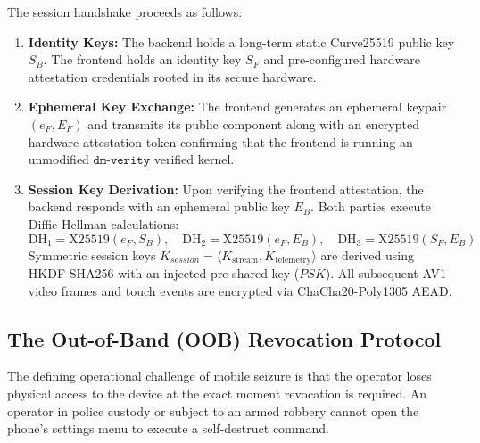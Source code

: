 The session handshake proceeds as follows:
\begin{enumerate}
    \item \textbf{Identity Keys:} The backend holds a long-term static Curve25519 public key $S_B$. The frontend holds an identity key $S_F$ and pre-configured hardware attestation credentials rooted in its secure hardware.
    \item \textbf{Ephemeral Key Exchange:} The frontend generates an ephemeral keypair $(e_F, E_F)$ and transmits its public component along with an encrypted hardware attestation token confirming that the frontend is running an unmodified $\texttt{dm-verity}$ verified kernel.
    \item \textbf{Session Key Derivation:} Upon verifying the frontend attestation, the backend responds with an ephemeral public key $E_B$. Both parties execute Diffie-Hellman calculations:
    \begin{equation}
        \text{DH}_1 = \text{X25519}(e_F, S_B), \quad \text{DH}_2 = \text{X25519}(e_F, E_B), \quad \text{DH}_3 = \text{X25519}(S_F, E_B)
    \end{equation}
    Symmetric session keys $K_{session} = \langle K_{\text{stream}}, K_{\text{telemetry}} \rangle$ are derived using HKDF-SHA256 with an injected pre-shared key ($PSK$). All subsequent AV1 video frames and touch events are encrypted via ChaCha20-Poly1305 AEAD.
\end{enumerate}

\subsection{The Out-of-Band (OOB) Revocation Protocol}
The defining operational challenge of mobile seizure is that the operator loses physical access to the device at the exact moment revocation is required. An operator in police custody or subject to an armed robbery cannot open the phone's settings menu to execute a self-destruct command.

